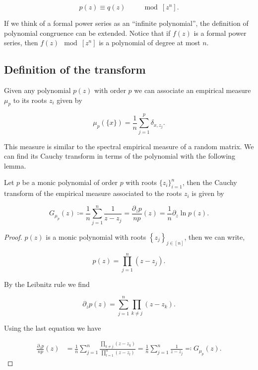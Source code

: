 \begin{equation*}
    p(z) \equiv q(z) \qquad \mod [z^n].
\end{equation*}

If we think of a formal power series as an ``infinite polynomial'', the definition of polynomial congruence can be extended. Notice that if $f(z)$ is a formal power series, then $f(z) \mod [z^n]$ is a polynomial of degree at most $n$.

\subsection{Definition of the transform}

Given any polynomial $p(z)$ with order $p$ we can associate an empirical measure $\mu_p$ to its roots $z_i$ given by

\begin{equation*}
    \mu_p(\{x\}) = \frac1n\sum_{j=1}^p \delta_{x,z_j}.
\end{equation*}

This measure is similar to the spectral empirical measure of a random matrix. We can find its Cauchy transform in terms of the polynomial with the following lemma.

\begin{lemma} \label{lemma:cauchy_empirical_polynomial}
    Let $p$ be a monic polynomial of order $p$ with roots $\{z_i\}_{i=1}^n$, then the Cauchy transform of the empirical measure associated to the roots $z_i$ is given by 

    \begin{equation*}
        G_{\mu_p}(z) \coloneqq \frac1n \sum_{j=1}^n \frac1{z - z_j} = \frac{\partial_z p }{n p}(z) = \frac1n \partial_z \ln p(z).
    \end{equation*}

\end{lemma}

\begin{proof}
    $p(z)$ is a monic polynomial with roots $\left\{ z_j \right\}_{j \in [n]}$, then we can write,

    \begin{equation*}
        p(z) = \prod_{j=1}^n (z-z_j).
    \end{equation*}

    By the Leibnitz rule we find

    \begin{equation*}
        \partial_z p(z) = \sum_{j=1}^n \prod_{k\neq j} (z-z_k).
    \end{equation*}

    Using the last equation we have

    \begin{align*}
        \frac{\partial_z p}{n p}(z) &= \frac1n\sum_{j=1}^n \frac{\prod_{k\neq j} (z-z_k) }{ \prod_{l=1}^n (z-z_l) } = \frac1n\sum_{j=1}^n \frac{1}{z - z_j} \eqqcolon G_{\mu_p}(z).
    \end{align*}
\end{proof}


